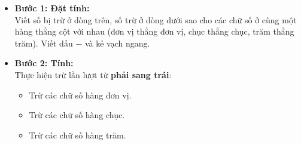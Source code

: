 \documentclass[10pt,a4paper]{article}
\begin{document}
\noindent
\begin{minipage}[t]{0.49\textwidth}\vspace{0pt}
\begin{tcolorbox}[
  enhanced,
  colback=violet!4!white,
  colframe=violet!75!black,
  arc=2mm, boxrule=0.8pt,
  left=2mm, right=2mm, top=1.8mm, bottom=1.8mm,
  title={\footnotesize\bfseries\color{white}\faKey\ 1. Quy tắc đặt tính và tính trừ}
]
{\footnotesize
\begin{itemize}\setlength{\itemsep}{1pt}\setlength{\leftskip}{-2.5mm}
  \item \textbf{Bước 1: Đặt tính:}\\
  Viết số bị trừ ở dòng trên, số trừ ở dòng dưới sao cho các chữ số ở cùng một hàng thẳng cột với nhau (đơn vị thẳng đơn vị, chục thẳng chục, trăm thẳng trăm). Viết dấu $-$ và kẻ vạch ngang.
  \item \textbf{Bước 2: Tính:}\\
  Thực hiện trừ lần lượt từ \textbf{phải sang trái}:
  \begin{itemize}\setlength{\itemsep}{0.5pt}\setlength{\leftskip}{-2mm}
    \item Trừ các chữ số hàng đơn vị.
    \item Trừ các chữ số hàng chục.
    \item Trừ các chữ số hàng trăm.
  \end{itemize}
\end{itemize}
}
\end{tcolorbox}
\end{minipage}
\hfill
\end{document}
